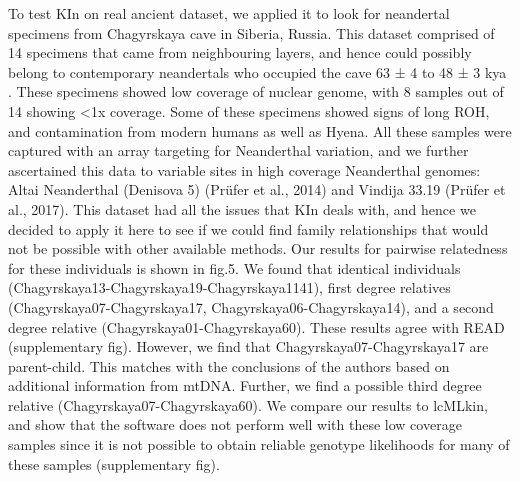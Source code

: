 \documentclass[12pt, letterpaper]{article}
\begin{document}
To test KIn on real ancient dataset, we applied it to look for neandertal specimens from Chagyrskaya cave in Siberia, Russia. This dataset comprised of 14 specimens that came from neighbouring layers, and hence could possibly belong to contemporary neandertals who occupied the cave 63 ± 4 to 48 ± 3 kya \cite{kolobova_archaeological_2020-1}. These specimens showed low coverage of nuclear genome, with 8 samples out of 14 showing <1x coverage. Some of these specimens showed signs of long ROH, and contamination from modern humans as well as Hyena. All these samples were captured with an array targeting for Neanderthal variation, and we further ascertained this data to variable sites in high coverage Neanderthal genomes: Altai Neanderthal (Denisova 5) (Prüfer et al., 2014) and Vindija 33.19 (Prüfer et al., 2017). This dataset had all the issues that KIn deals with, and hence we decided to apply it here to see if we could find family relationships that would not be possible with other available methods. Our results for pairwise relatedness for these individuals is shown in fig.5. We found that identical individuals (Chagyrskaya13-Chagyrskaya19-Chagyrskaya1141), first degree relatives (Chagyrskaya07-Chagyrskaya17, Chagyrskaya06-Chagyrskaya14), and a second degree relative (Chagyrskaya01-Chagyrskaya60). These results agree with READ (supplementary fig). However, we find that Chagyrskaya07-Chagyrskaya17 are parent-child. This matches with the conclusions of the authors based on additional information from mtDNA. Further, we find a possible third degree relative (Chagyrskaya07-Chagyrskaya60). We compare our results to lcMLkin, and show that the software does not perform well with these low coverage samples since it is not possible to obtain reliable genotype likelihoods for many of these samples (supplementary fig).
\end{document}
